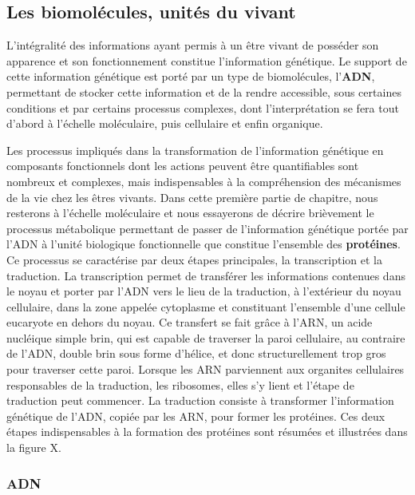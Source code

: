 
\subsection{Les biomolécules, unités du vivant}

L'intégralité des informations ayant permis à un être vivant de posséder son apparence et son fonctionnement constitue l'information génétique. Le support de cette information génétique est porté par un type de biomolécules, l'\textbf{ADN}, permettant de stocker cette information et de la rendre accessible, sous certaines conditions et par certains processus complexes, dont l'interprétation se fera tout d'abord à l'échelle moléculaire, puis cellulaire et enfin organique.

Les processus impliqués dans la transformation de l'information génétique en composants fonctionnels dont les actions peuvent être quantifiables sont nombreux et complexes, mais indispensables à la compréhension des mécanismes de la vie chez les êtres vivants. Dans cette première partie de chapitre, nous resterons à l'échelle moléculaire et nous essayerons de décrire brièvement le processus métabolique permettant de passer de l'information génétique portée par l'ADN à l'unité biologique fonctionnelle que constitue l'ensemble des \textbf{protéines}.
Ce processus se caractérise par deux étapes principales, la transcription et la traduction. La transcription permet de transférer les informations contenues dans le noyau et porter par l'ADN vers le lieu de la traduction, à l'extérieur du noyau cellulaire, dans la zone appelée cytoplasme et constituant l'ensemble d'une cellule eucaryote en dehors du noyau. Ce transfert se fait grâce à l'ARN, un acide nucléique simple brin, qui est capable de traverser la paroi cellulaire, au contraire de l'ADN, double brin sous forme d'hélice, et donc structurellement trop gros pour traverser cette paroi. Lorsque les ARN parviennent aux organites cellulaires responsables de la traduction, les ribosomes, elles s'y lient et l'étape de traduction peut commencer. La traduction consiste à transformer l'information génétique de l'ADN, copiée par les ARN, pour former les protéines. Ces deux étapes indispensables à la formation des protéines sont résumées et illustrées dans la figure X.

\subsubsection{ADN}

